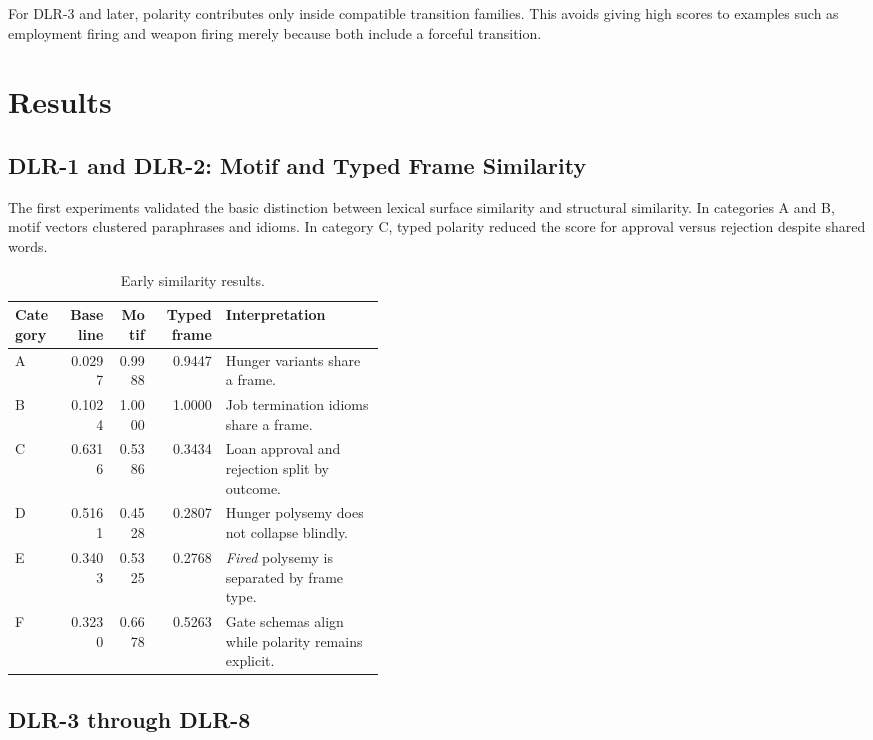 \documentclass[11pt]{article}
\begin{document}
For DLR-3 and later, polarity contributes only inside compatible transition
families. This avoids giving high scores to examples such as employment firing
and weapon firing merely because both include a forceful transition.

\section{Results}

\subsection{DLR-1 and DLR-2: Motif and Typed Frame Similarity}

The first experiments validated the basic distinction between lexical surface
similarity and structural similarity. In categories A and B, motif vectors
clustered paraphrases and idioms. In category C, typed polarity reduced the
score for approval versus rejection despite shared words.

\begin{table}[h]
\centering
\caption{Early similarity results.}
\small
\begin{tabular}{lrrrp{0.43\linewidth}}
\toprule
Category & Baseline & Motif & Typed frame & Interpretation \\
\midrule
A & 0.0297 & 0.9988 & 0.9447 & Hunger variants share a frame. \\
B & 0.1024 & 1.0000 & 1.0000 & Job termination idioms share a frame. \\
C & 0.6316 & 0.5386 & 0.3434 & Loan approval and rejection split by outcome. \\
D & 0.5161 & 0.4528 & 0.2807 & Hunger polysemy does not collapse blindly. \\
E & 0.3403 & 0.5325 & 0.2768 & \emph{Fired} polysemy is separated by frame type. \\
F & 0.3230 & 0.6678 & 0.5263 & Gate schemas align while polarity remains explicit. \\
\bottomrule
\end{tabular}
\end{table}

\subsection{DLR-3 through DLR-8}
\end{document}
